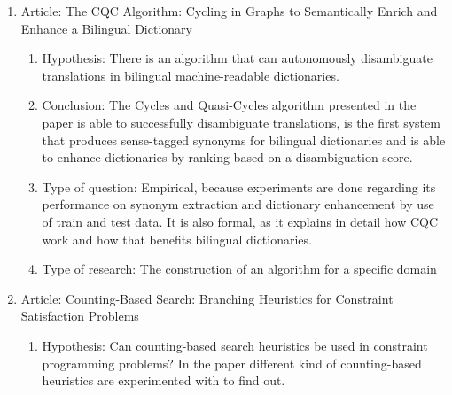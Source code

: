 \documentclass{article}
\begin{document}
\begin{enumerate}
{\begin{enumerate}
{\begin{enumerate}
            \item Type of research: Implement and testing. An algorithm is described for the particular task at hand and after that was tested against other algorithms to see what performs best.
        \end{enumerate}
        }
        \item {Article: The CQC Algorithm: Cycling in Graphs to Semantically
Enrich and Enhance a Bilingual Dictionary
        \begin{enumerate}
            \item Hypothesis:
            There is an algorithm that can autonomously disambiguate translations in bilingual machine-readable dictionaries.
            \item Conclusion: The Cycles and Quasi-Cycles algorithm presented in the paper is able to successfully disambiguate translations, is the first system that produces sense-tagged synonyms for bilingual dictionaries and is able to enhance dictionaries by ranking based on a disambiguation score.
            \item Type of question: Empirical, because experiments are done regarding its performance on synonym extraction and dictionary enhancement by use of train and test data. It is also formal, as it explains in detail how CQC work and how that benefits bilingual dictionaries.
            \item Type of research: The construction of an algorithm for a specific domain
        \end{enumerate}
        }
        \item {Article: Counting-Based Search:
Branching Heuristics for Constraint Satisfaction Problems
        \begin{enumerate}
            \item Hypothesis: Can counting-based search heuristics be used in constraint programming problems? In the paper different kind of counting-based heuristics are experimented with to find out.
            

\end{enumerate}}
\end{enumerate}}
\end{enumerate}
\end{document}
